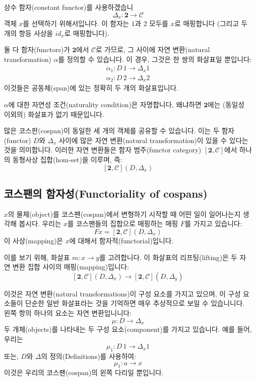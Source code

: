 \documentclass[DaoFP]{subfiles}
\begin{document}
상수 함자(constant functor)를 사용하겠습니
\[ \Delta_x \colon \mathbf{2} \to \mathcal{C} \]
객체 $x$를 선택하기 위해서입니다. 이 함자는 $1$과 $2$ 모두를 $x$로 매핑합니다 (그리고 두 개의 항등 사상을 $id_x$로 매핑합니다).

둘 다 함자(functors)가 $\mathbf{2}$에서 $\mathcal{C}$로 가므로, 그 사이에 자연 변환(natural transformation) $\alpha$를 정의할 수 있습니다. 이 경우, 그것은 한 쌍의 화살표일 뿐입니다:
\begin{align*}
\alpha_1 \colon D \, 1 \to \Delta_x 1 \\
\alpha_2 \colon D \, 2 \to \Delta_x 2
\end{align*}
이것들은 공동체(span)에 있는 정확히 두 개의 화살표입니다.

$\alpha$에 대한 자연성 조건(naturality condition)은 자명합니다, 왜냐하면 $\mathbf{2}$에는 (동일성 이외의) 화살표가 없기 때문입니다.

많은 코스판(cospan)이 동일한 세 개의 객체를 공유할 수 있습니다. 이는 두 함자(functor) $D$와 $\Delta_x$ 사이에 많은 자연 변환(natural transformation)이 있을 수 있다는 것을 의미합니다. 이러한 자연 변환들은 함자 범주(functor category) $[\mathbf{2}, \mathcal{C}]$에서 하나의 동형사상 집합(hom-set)을 이루며, 즉:
\[ [\mathbf{2}, \mathcal{C}](D, \Delta_x) \]

\subsection{코스팬의 함자성(Functoriality of cospans)}

$x$의 물체(object)를 코스팬(cospan)에서 변형하기 시작할 때 어떤 일이 일어나는지 생각해 봅시다. 우리는 $x$를 코스팬들의 집합으로 매핑하는 매핑 $F$를 가지고 있습니다:
\[ F x = [\mathbf{2}, \mathcal{C}](D, \Delta_x) \]
이 사상(mapping)은 $x$에 대해서 함자적(functorial)입니다.

이를 보기 위해, 화살표 $m \colon x \to y$를 고려합니다. 이 화살표의 리프팅(lifting)은 두 자연 변환 집합 사이의 매핑(mapping)입니다:
\[ [\mathbf{2}, \mathcal{C}](D, \Delta_x) \to [\mathbf{2}, \mathcal{C}](D, \Delta_{y}) \] 
 
이것은 자연 변환(natural transformations)이 구성 요소를 가지고 있으며, 이 구성 요소들이 단순한 일반 화살표라는 것을 기억하면 매우 추상적으로 보일 수 있습니니다. 왼쪽 항의 하나의 요소는 자연 변환입니니다:
\[ \mu \colon D \to \Delta_x \]
두 개체(objects)를 나타내는 두 구성 요소(component)를 가지고 있습니다. 예를 들어, 우리는
\[ \mu_1 \colon D \, 1 \to \Delta_x 1 \]
또는, $D$와 $\Delta$의 정의(Definitions)를 사용하여:
\[ \mu_1 \colon a \to x \]
이것은 우리의 코스팬(cospan)의 왼쪽 다리일 뿐입니다.
\end{document}
